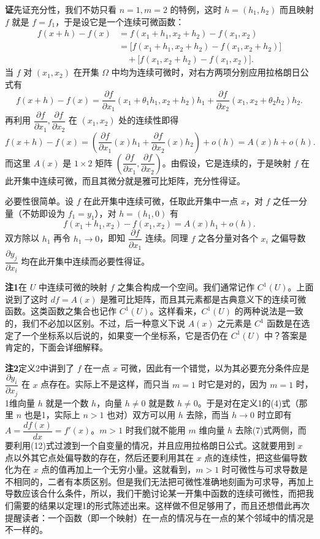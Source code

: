 \noindent\textbf{证}\quad 先证充分性，我们不妨只看 $n=1,m=2$ 的特例，这时 $h=(h_1,h_2)$ 而且映射 $f$ 就是 $f=f_1$，于是设它是一个连续可微函数：
\begin{align}
 f(x+h)-f(x)&=f(x_1+h_1,x_2+h_2)-f(x_1,x_2)\\
 &=\bigl[f(x_1+h_1,x_2+h_2)-f(x_1,x_2+h_2)\bigr]\\
 &\quad+\bigl[f(x_1,x_2+h_2)-f(x_1,x_2)\bigr].
 \tag{12}
\end{align}
当 $f$ 对 $(x_1,x_2)$ 在开集 $\Omega$ 中均为连续可微时，对右方两项分别应用拉格朗日公式有
\[
 f(x+h)-f(x)=\frac{\partial f}{\partial x_1}(x_1+\theta_1h_1,x_2+h_2)h_1+\frac{\partial f}{\partial x_2}(x_1,x_2+\theta_2h_2)h_2.
\]
再利用 $\dfrac{\partial f}{\partial x_1},\dfrac{\partial f}{\partial x_2}$ 在 $(x_1,x_2)$ 处的连续性即得
\[
 f(x+h)-f(x)=\left(\frac{\partial f}{\partial x_1}(x)h_1+\frac{\partial f}{\partial x_2}(x)h_2\right)+o(h)
 =A(x)h+o(h).
\]
而这里 $A(x)$ 是 $1\times2$ 矩阵 $\left(\dfrac{\partial f}{\partial x_1},\dfrac{\partial f}{\partial x_2}\right)$。由假设，它是连续的，于是映射 $f$ 在此开集中连续可微，而且其微分就是雅可比矩阵，充分性得证。

必要性很简单。设 $f$ 在此开集中连续可微，任取此开集中一点 $x$，对 $f$ 之任一分量（不妨即设为 $f_1=y_1$），对 $h=(h_1,0)$ 有
\[
 f(x_1+h_1,x_2)-f(x_1,x_2)=A(x)h_1+o(h).
\]
双方除以 $h_1$ 再令 $h_1\to0$，即知 $\dfrac{\partial f}{\partial x_1}$ 连续。同理 $f$ 之各分量对各个 $x_i$ 之偏导数 $\dfrac{\partial y_j}{\partial x_i}$ 均在此开集中连续而必要性得证。

\noindent\textbf{注1}\quad 在 $U$ 中连续可微的映射 $f$ 之集合构成一个空间。我们通常记作 $C^1(U)$。上面说到了这时 $df=A(x)$ 是雅可比矩阵，而且其元素都是古典意义下的连续可微函数。这类函数之集合也记作 $C^1(U)$。这样看来，$C^1(U)$ 的两种说法是一致的，我们不必加以区别。不过，后一种意义下说 $A(x)$ 之元素是 $C^1$ 函数是在选定了一个坐标系以后说的，如果变一个坐标系，它是否仍在 $C^1(U)$ 中？答案是肯定的，下面会详细解释。

\noindent\textbf{注2}\quad 定义2中讲到了 $f$ 在一点 $x$ 可微，因此有一个错觉，以为其必要充分条件应是 $\dfrac{\partial y_i}{\partial x_j}$ 在 $x$ 点存在。实际上不是这样，而只当 $m=1$ 时它是对的，因为 $m=1$ 时，1维向量 $h$ 就是一个数 $h$，向量 $h\ne0$ 就是数 $h\ne0$。于是对在定义1的(4)式（那里 $n$ 也是1，实际上 $n>1$ 也对）双方可以用 $h$ 去除，而当 $h\to0$ 时立即有 $A=\dfrac{df(x)}{dx}=f'(x)$。$m>1$ 时我们就不能用 $m$ 维向量 $h$ 去除(7)式两侧，而要利用(12)式过渡到一个自变量的情况，并且应用拉格朗日公式。这就要用到 $x$ 点以外其它点处偏导数的存在，然后还要利用其在 $x$ 点的连续性，把这些偏导数化为在 $x$ 点的值再加上一个无穷小量。这就看到，$m>1$ 时可微性与可求导数是不相同的，二者有本质区别。但是我们无法把可微性准确地刻画为可求导，再加上导数应该合什么条件，所以，我们干脆讨论某一开集中函数的连续可微性，而把我们需要的结果以定理1的形式陈述出来。这样做不但足够用了，而且还想借此再次提醒读者：一个函数（即一个映射）在一点的情况与在一点的某个邻域中的情况是不一样的。

